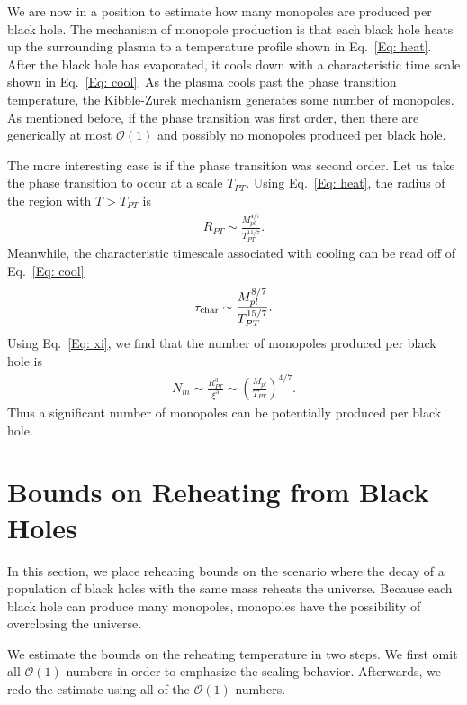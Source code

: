 \documentclass[superscriptaddress,groupedaddress,nofootnoteinbib,11pt]{article}
\newcommand\eea{\end{eqnarray}}
\newcommand\bea{\begin{eqnarray}}
\newcommand{\mpl}{M_{pl}}
\begin{document}
We are now in a position to estimate how many monopoles are produced per black hole.  The mechanism of monopole production is that each black hole heats up the surrounding plasma to a temperature profile shown in Eq.~\ref{Eq: heat}.  After the black hole has evaporated, it cools down with a characteristic time scale shown in Eq.~\ref{Eq: cool}.  As the plasma cools past the phase transition temperature, the Kibble-Zurek mechanism generates some number of monopoles.
As mentioned before, if the phase transition was first order, then there are generically at most $\mathcal{O}(1)$ and possibly no monopoles produced per black hole.

The more interesting case is if the phase transition was second order.  Let us take the phase transition to occur at a scale $T_{PT}$.  Using Eq.~\ref{Eq: heat}, the radius of the region with $T > T_{PT}$ is
\bea\label{Eq:RPT}
R_{PT} \sim \frac{\mpl^{4/7}}{T_{PT}^{11/7}}.
\eea
Meanwhile, the characteristic timescale associated with cooling can be read off of Eq.~\ref{Eq: cool}
\bea\label{Eq:quenchtime}
\tau_{\rm char} \sim \frac{\mpl^{8/7}}{T_{PT}^{15/7}}.
\eea
Using Eq.~\ref{Eq: xi}, we find that the number of monopoles produced per black hole is
\bea\label{Eq:monopoleperBH}
N_m \sim \frac{R_{PT}^3}{\xi^3} \sim \left ( \frac{\mpl}{T_{PT}} \right )^{4/7} .
\eea
Thus a significant number of monopoles can be potentially produced per black hole.



\section{Bounds on Reheating from Black Holes} \label{Sec: reheat}

In this section, we place reheating bounds on the scenario where the decay of a population of black holes with the same mass reheats the universe.  Because each black hole can produce many monopoles, monopoles have the possibility of overclosing the universe.

We estimate the bounds on the reheating temperature in two steps.  We first omit all $\mathcal{O}(1)$ numbers in order to emphasize the scaling behavior.  Afterwards, we redo the estimate using all of the $\mathcal{O}(1)$ numbers.
\end{document}
